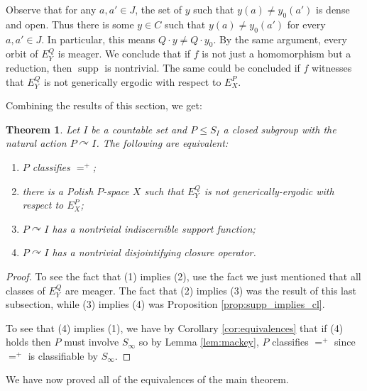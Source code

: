 \documentclass[12pt]{amsart}
\theoremstyle{plain}
\newtheorem{theorem}{Theorem}[section]
\theoremstyle{definition}
\DeclareMathOperator{\supp}{supp}
\begin{document}
Observe that for any $a, a' \in J$, the set of $y$ such that $y(a) \neq y_0(a')$ is dense and open.
Thus there is some $y \in C$ such that $y(a) \neq y_0(a')$ for every $a, a' \in J$.
In particular, this means $Q \cdot y \neq Q \cdot y_0$.
By the same argument, every orbit of $E^Q_Y$ is meager.
We conclude that if $f$ is not just a homomorphism but a reduction, then $\supp$ is nontrivial.
The same could be concluded if $f$ witnesses that $E^Q_Y$ is not generically ergodic with respect to $E^P_X$.

Combining the results of this section, we get:

\begin{theorem}
Let $I$ be a countable set and $P \le S_I$ a closed subgroup with the natural action $P \curvearrowright I$.
The following are equivalent:
\begin{enumerate}
    \item $P$ classifies $=^+$;
    \item there is a Polish $P$-space $X$ such that $E^Q_{Y}$ is not generically-ergodic with respect to $E^P_X$;
    \item $P \curvearrowright I$ has a nontrivial indiscernible support function;
    \item $P \curvearrowright I$ has a nontrivial disjointifying closure operator.
\end{enumerate}
\end{theorem}

\begin{proof}
To see the fact that (1) implies (2), use the fact we just mentioned that all classes of $E^Q_{Y}$ are meager.
The fact that (2) implies (3) was the result of this last subsection, while (3) implies (4) was Proposition \ref{prop:supp_implies_cl}.

To see that (4) implies (1), we have by Corollary \ref{cor:equivalences} that if (4) holds then $P$ must involve $S_\infty$ so by Lemma \ref{lem:mackey}, $P$ classifies $=^+$ since $=^+$ is classifiable by $S_\infty$.
\end{proof}

We have now proved all of the equivalences of the main theorem.




\end{document}
